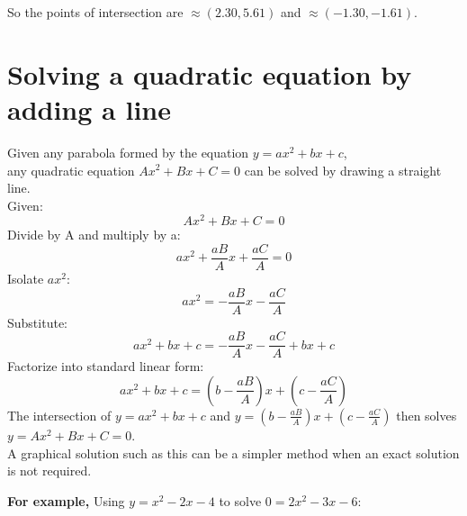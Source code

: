 \documentclass[12pt]{article}
\begin{document}
So the points of intersection are $\approx(2.30,5.61)$ and $\approx(-1.30,-1.61).$
\begin{center}
\end{center}

\section*{Solving a quadratic equation by adding a line}

Given any parabola formed by the equation $y=ax^2+bx+c$,\\any quadratic equation $Ax^2+Bx+C=0$ can be solved by drawing a straight line.\\

\noindent
Given:
$$Ax^2+Bx+C=0$$
Divide by A and multiply by a:
$$ax^2+\frac{aB}{A}x+\frac{aC}{A}=0$$
Isolate $ax^2$:
$$ax^2=-\frac{aB}{A}x-\frac{aC}{A}$$
Substitute:
$$ax^2+bx+c=-\frac{aB}{A}x-\frac{aC}{A}+bx+c$$
Factorize into standard linear form:
$$ax^2+bx+c=(b-\frac{aB}{A})x+(c-\frac{aC}{A})$$
The intersection of $y=ax^2+bx+c$ and $y=(b-\frac{aB}{A})x+(c-\frac{aC}{A})$ then solves $y=Ax^2+Bx+C=0$.\\

A graphical solution such as this can be a simpler method when an exact solution is not required.\\

\newpage

\textbf{For example,} Using $y=x^2-2x-4$ to solve $0=2x^2-3x-6$:\\
\end{document}
